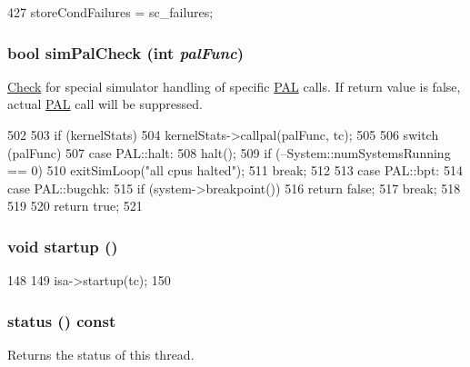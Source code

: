 \begin{DoxyCode}
427     { storeCondFailures = sc_failures; }
\end{DoxyCode}
\hypertarget{classSimpleThread_a461205960be9d52e9beda48a77e9c600}{
\subsubsection[{simPalCheck}]{\setlength{\rightskip}{0pt plus 5cm}bool simPalCheck (int {\em palFunc})}}
\label{classSimpleThread_a461205960be9d52e9beda48a77e9c600}
\hyperlink{classCheck}{Check} for special simulator handling of specific \hyperlink{structPAL}{PAL} calls. If return value is false, actual \hyperlink{structPAL}{PAL} call will be suppressed. 


\begin{DoxyCode}
502 {
503     if (kernelStats)
504         kernelStats->callpal(palFunc, tc);
505 
506     switch (palFunc) {
507       case PAL::halt:
508         halt();
509         if (--System::numSystemsRunning == 0)
510             exitSimLoop("all cpus halted");
511         break;
512 
513       case PAL::bpt:
514       case PAL::bugchk:
515         if (system->breakpoint())
516             return false;
517         break;
518     }
519 
520     return true;
521 }
\end{DoxyCode}
\hypertarget{classSimpleThread_aecc7d8debf54990ffeaaed5bac7d7d81}{
\subsubsection[{startup}]{\setlength{\rightskip}{0pt plus 5cm}void startup ()}}
\label{classSimpleThread_aecc7d8debf54990ffeaaed5bac7d7d81}



\begin{DoxyCode}
148 {
149     isa->startup(tc);
150 }
\end{DoxyCode}
\hypertarget{classSimpleThread_a2ad9e92a82d6f783b3061584729c2f4a}{
\subsubsection[{status}]{ status () const}}
\label{classSimpleThread_a2ad9e92a82d6f783b3061584729c2f4a}
Returns the status of this thread. 

